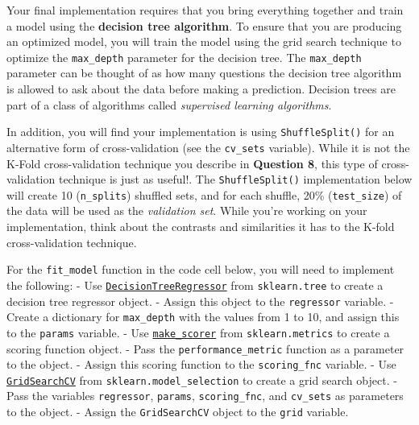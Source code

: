 \documentclass[11pt]{article}
\begin{document}
Your final implementation requires that you bring everything together
and train a model using the \textbf{decision tree algorithm}. To ensure
that you are producing an optimized model, you will train the model
using the grid search technique to optimize the
\texttt{\textquotesingle{}max\_depth\textquotesingle{}} parameter for
the decision tree. The
\texttt{\textquotesingle{}max\_depth\textquotesingle{}} parameter can be
thought of as how many questions the decision tree algorithm is allowed
to ask about the data before making a prediction. Decision trees are
part of a class of algorithms called \emph{supervised learning
algorithms}.

In addition, you will find your implementation is using
\texttt{ShuffleSplit()} for an alternative form of cross-validation (see
the \texttt{\textquotesingle{}cv\_sets\textquotesingle{}} variable).
While it is not the K-Fold cross-validation technique you describe in
\textbf{Question 8}, this type of cross-validation technique is just as
useful!. The \texttt{ShuffleSplit()} implementation below will create 10
(\texttt{\textquotesingle{}n\_splits\textquotesingle{}}) shuffled sets,
and for each shuffle, 20\%
(\texttt{\textquotesingle{}test\_size\textquotesingle{}}) of the data
will be used as the \emph{validation set}. While you're working on your
implementation, think about the contrasts and similarities it has to the
K-fold cross-validation technique.

For the \texttt{fit\_model} function in the code cell below, you will
need to implement the following: - Use
\href{http://scikit-learn.org/stable/modules/generated/sklearn.tree.DecisionTreeRegressor.html}{\texttt{DecisionTreeRegressor}}
from \texttt{sklearn.tree} to create a decision tree regressor object. -
Assign this object to the
\texttt{\textquotesingle{}regressor\textquotesingle{}} variable. -
Create a dictionary for
\texttt{\textquotesingle{}max\_depth\textquotesingle{}} with the values
from 1 to 10, and assign this to the
\texttt{\textquotesingle{}params\textquotesingle{}} variable. - Use
\href{http://scikit-learn.org/stable/modules/generated/sklearn.metrics.make_scorer.html}{\texttt{make\_scorer}}
from \texttt{sklearn.metrics} to create a scoring function object. -
Pass the \texttt{performance\_metric} function as a parameter to the
object. - Assign this scoring function to the
\texttt{\textquotesingle{}scoring\_fnc\textquotesingle{}} variable. -
Use
\href{http://scikit-learn.org/0.20/modules/generated/sklearn.model_selection.GridSearchCV.html}{\texttt{GridSearchCV}}
from \texttt{sklearn.model\_selection} to create a grid search object. -
Pass the variables
\texttt{\textquotesingle{}regressor\textquotesingle{}},
\texttt{\textquotesingle{}params\textquotesingle{}},
\texttt{\textquotesingle{}scoring\_fnc\textquotesingle{}}, and
\texttt{\textquotesingle{}cv\_sets\textquotesingle{}} as parameters to
the object. - Assign the \texttt{GridSearchCV} object to the
\texttt{\textquotesingle{}grid\textquotesingle{}} variable.
\end{document}
